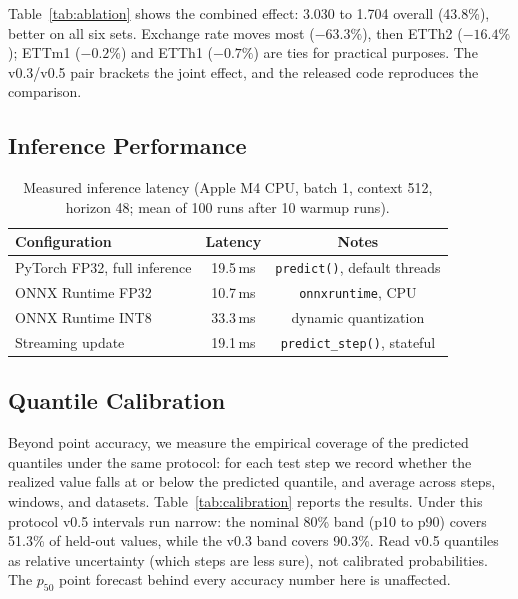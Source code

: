 \documentclass[11pt]{article}
\begin{document}
Table~\ref{tab:ablation} shows the combined effect: 3.030 to 1.704 overall (43.8\%), better on all six sets. Exchange rate moves most ($-63.3\%$), then ETTh2 ($-16.4\%$); ETTm1 ($-0.2\%$) and ETTh1 ($-0.7\%$) are ties for practical purposes. The v0.3/v0.5 pair brackets the joint effect, and the released code reproduces the comparison.

\subsection{Inference Performance}
\label{sec:inference}

\begin{table}[t]
\centering
\caption{Measured inference latency (Apple M4 CPU, batch 1, context 512, horizon 48; mean of 100 runs after 10 warmup runs).}
\label{tab:latency}
\begin{tabular}{lcc}
\toprule
Configuration & Latency & Notes \\
\midrule
PyTorch FP32, full inference    & 19.5\,ms & \texttt{predict()}, default threads \\
ONNX Runtime FP32               & 10.7\,ms & \texttt{onnxruntime}, CPU \\
ONNX Runtime INT8               & 33.3\,ms & dynamic quantization \\
Streaming update                & 19.1\,ms & \texttt{predict\_step()}, stateful \\
\bottomrule
\end{tabular}
\end{table}

\subsection{Quantile Calibration}
\label{sec:calibration}

Beyond point accuracy, we measure the empirical coverage of the predicted quantiles under the same protocol: for each test step we record whether the realized value falls at or below the predicted quantile, and average across steps, windows, and datasets. Table~\ref{tab:calibration} reports the results. Under this protocol v0.5 intervals run narrow: the nominal 80\% band (p10 to p90) covers 51.3\% of held-out values, while the v0.3 band covers 90.3\%. Read v0.5 quantiles as relative uncertainty (which steps are less sure), not calibrated probabilities. The $p_{50}$ point forecast behind every accuracy number here is unaffected.
\end{document}
